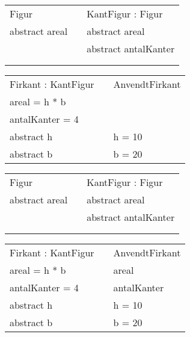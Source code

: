 \begin{frame}[fragile] 
\begin{table}[h]
\begin{tabular}{|l|l|l|}
 \cline{1-1} \cline{3-3} 
Figur          &  & KantFigur : Figur    \\ \cline{1-1} \cline{3-3} 
abstract areal &  & abstract areal       \\
               &  & abstract antalKanter \\
               &  &                      \\
               &  &                      \\ \cline{1-1} \cline{3-3} 
\end{tabular}
\end{table}
\begin{table}[h]
\begin{tabular}{|l|l|l|}
 \cline{1-1} \cline{3-3} 
Firkant : KantFigur &  & AnvendtFirkant       \\ \cline{1-1} \cline{3-3} 
areal = h * b       &  &                      \\
antalKanter = 4     &  &                      \\
abstract h          &  & h = 10               \\
abstract b          &  & b = 20               \\ \cline{1-1} \cline{3-3} 
\end{tabular}
\end{table}
\end{frame}

\begin{frame}[fragile] 
\begin{table}[h]
\begin{tabular}{|l|l|l|}
 \cline{1-1} \cline{3-3} 
Figur          &  & KantFigur : Figur    \\ \cline{1-1} \cline{3-3} 
abstract areal &  & abstract areal       \\
               &  & abstract antalKanter \\
               &  &                      \\
               &  &                      \\ \cline{1-1} \cline{3-3} 
\end{tabular}
\end{table}
\begin{table}[h]
\begin{tabular}{|l|l|l|}
 \cline{1-1} \cline{3-3} 
Firkant : KantFigur &  & AnvendtFirkant       \\ \cline{1-1} \cline{3-3} 
areal = h * b       &  & areal                \\
antalKanter = 4     &  & antalKanter          \\
abstract h          &  & h = 10               \\
abstract b          &  & b = 20               \\ \cline{1-1} \cline{3-3} 
\end{tabular}
\end{table}
\end{frame}

